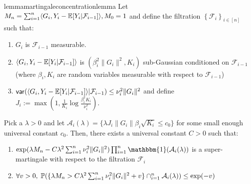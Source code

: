 \begin{restatable}{lemma}{martingaleconcentrationlemma}\label{lemma:martingale_concentration_lemma}
Let $M_{n} = \sum_{i=1}^{n}\langle G_i, Y_i - \mathbb{E}[Y_i|\mathcal{F}_{i-1}] \rangle, M_{0} = 1$ and define the filtration $\left\{\mathcal{F}_{i}\right\}_{i \in [n]}$ such that:
\begin{enumerate}
    \item  $G_i$ is $\mathcal{F}_{i-1}$ measurable.
    \item  $\langle G_i,Y_i-\mathbb{E} [Y_i|\mathcal{F}_{i-1}]\rangle$ is $(\beta_i^{2}\|G_i\|^{2}, K_i)$ sub-Gaussian conditioned on $\mathcal{F}_{i-1}$ (where $\beta_i,K_i$ are random variables measurable with respect to $\mathcal{F}_{i-1}$)
    \item $\mathsf{var}(\langle G_i, Y_i - \mathbb{E}[Y_i|\mathcal{F}_{i-1}]\rangle|\mathcal{F}_{i-1}) \leq \nu^2_i \|G_i\|^2$ and define $J_i := \max(1,\frac{1}{K_i}\log\frac{\beta_i^2 K_i}{\nu^2_i})$.
\end{enumerate}
Pick a $\lambda > 0$ and let $\mathcal{A}_i(\lambda) = \{\lambda J_i\|G_i\|\beta_i\sqrt{K_i} \leq c_0\}$ for some small enough universal constant $c_0$. Then, there exists a universal constant $C > 0$ such that:
\begin{enumerate}
    \item $\exp(\lambda M_{n} - C\lambda^2\sum_{i=1}^{n}\nu_i^2\|G_i\|^2 )\prod_{i=1}^{n}\mathbbm{1}(\mathcal{A}_i(\lambda))$ is a super-martingale with respect to the filtration $\mathcal{F}_{i}$
    \item $\forall v > 0, \; \mathbb{P}(\{\lambda M_n > C \lambda^2\sum_{i=1}^{n}\nu_i^2\|G_i\|^2 + v\}\cap_{i=1}^{n} \mathcal{A}_i(\lambda)) \leq \exp(-v)$
\end{enumerate}
\end{restatable}


